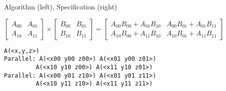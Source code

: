 \begin{table*}[t]

\centering
\vspace{-0.8em}
\caption{Algorithm (left), Specification (right)}
\label{tab:mytable}
\begin{minipage}{.45\linewidth}
\centering
\begin{small}
\centering
\vspace{10pt}
$\left[\begin{array}{ll}
A_{00} & A_{01} \\
A_{10} & A_{11}
\end{array}\right] \times\left[\begin{array}{ll}
B_{00} & B_{01} \\
B_{10} & B_{11}
\end{array}\right]=\left[\begin{array}{ll}
A_{00} B_{00}+A_{01} B_{10} & A_{00} B_{01}+A_{01} B_{11} \\
A_{10} B_{00}+A_{11} B_{10} & A_{10} B_{01}+A_{11} B_{11}
\end{array}\right]$

\end{small}
\end{minipage}%
\begin{minipage}{.45\linewidth}
\centering
\begin{small}
\begin{verbatim}
A(<x,y,z>)
Parallel: A(<x00 y00 z00>) A(<x01 y00 z01>) 
         A(<x10 y10 z00>) A(<x11 y10 z01>)
Parallel: A(<x00 y01 z10>) A(<x01 y01 z11>) 
         A(<x10 y11 z10>) A(<x11 y11 z11>)
\end{verbatim}
\end{small}

\end{minipage}
\end{table*}


